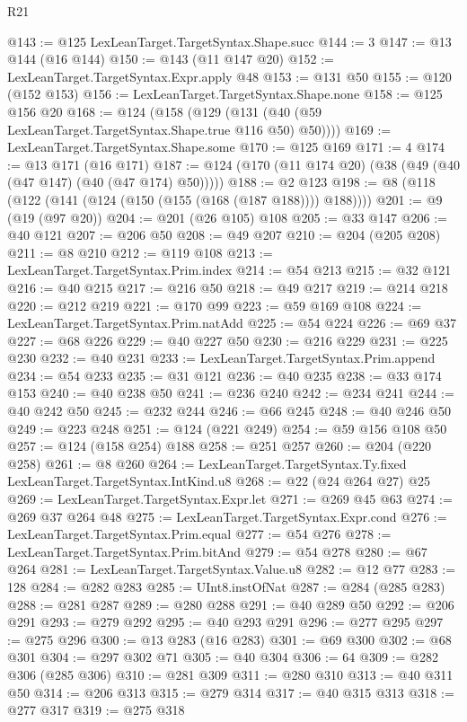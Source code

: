 \begin{lexlean}{R21}
\begin{coremodule}
{{{{{{{{{{{{{{{@143 := @125 LexLeanTarget.TargetSyntax.Shape.succ
@144 := 3
@147 := @13 @144 (@16 @144)
@150 := @143 (@11 @147 @20)
@152 := LexLeanTarget.TargetSyntax.Expr.apply @48
@153 := @131 @50
@155 := @120 (@152 @153)
@156 := LexLeanTarget.TargetSyntax.Shape.none
@158 := @125 @156 @20
@168 := @124 (@158 (@129 (@131 (@40 (@59 LexLeanTarget.TargetSyntax.Shape.true @116 @50) @50))))
@169 := LexLeanTarget.TargetSyntax.Shape.some
@170 := @125 @169
@171 := 4
@174 := @13 @171 (@16 @171)
@187 := @124 (@170 (@11 @174 @20) (@38 (@49 (@40 (@47 @147) (@40 (@47 @174) @50)))))
@188 := @2 @123
@198 := @8 (@118 (@122 (@141 (@124 (@150 (@155 (@168 (@187 @188)))) @188))))
@201 := @9 (@19 (@97 @20))
@204 := @201 (@26 @105) @108
@205 := @33 @147
@206 := @40 @121
@207 := @206 @50
@208 := @49 @207
@210 := @204 (@205 @208)
@211 := @8 @210
@212 := @119 @108
@213 := LexLeanTarget.TargetSyntax.Prim.index
@214 := @54 @213
@215 := @32 @121
@216 := @40 @215
@217 := @216 @50
@218 := @49 @217
@219 := @214 @218
@220 := @212 @219
@221 := @170 @99
@223 := @59 @169 @108
@224 := LexLeanTarget.TargetSyntax.Prim.natAdd
@225 := @54 @224
@226 := @69 @37
@227 := @68 @226
@229 := @40 @227 @50
@230 := @216 @229
@231 := @225 @230
@232 := @40 @231
@233 := LexLeanTarget.TargetSyntax.Prim.append
@234 := @54 @233
@235 := @31 @121
@236 := @40 @235
@238 := @33 @174 @153
@240 := @40 @238 @50
@241 := @236 @240
@242 := @234 @241
@244 := @40 @242 @50
@245 := @232 @244
@246 := @66 @245
@248 := @40 @246 @50
@249 := @223 @248
@251 := @124 (@221 @249)
@254 := @59 @156 @108 @50
@257 := @124 (@158 @254) @188
@258 := @251 @257
@260 := @204 (@220 @258)
@261 := @8 @260
@264 := LexLeanTarget.TargetSyntax.Ty.fixed LexLeanTarget.TargetSyntax.IntKind.u8
@268 := @22 (@24 @264 @27) @25
@269 := LexLeanTarget.TargetSyntax.Expr.let
@271 := @269 @45 @63
@274 := @269 @37 @264 @48
@275 := LexLeanTarget.TargetSyntax.Expr.cond
@276 := LexLeanTarget.TargetSyntax.Prim.equal
@277 := @54 @276
@278 := LexLeanTarget.TargetSyntax.Prim.bitAnd
@279 := @54 @278
@280 := @67 @264
@281 := LexLeanTarget.TargetSyntax.Value.u8
@282 := @12 @77
@283 := 128
@284 := @282 @283
@285 := UInt8.instOfNat
@287 := @284 (@285 @283)
@288 := @281 @287
@289 := @280 @288
@291 := @40 @289 @50
@292 := @206 @291
@293 := @279 @292
@295 := @40 @293 @291
@296 := @277 @295
@297 := @275 @296
@300 := @13 @283 (@16 @283)
@301 := @69 @300
@302 := @68 @301
@304 := @297 @302 @71
@305 := @40 @304
@306 := 64
@309 := @282 @306 (@285 @306)
@310 := @281 @309
@311 := @280 @310
@313 := @40 @311 @50
@314 := @206 @313
@315 := @279 @314
@317 := @40 @315 @313
@318 := @277 @317
@319 := @275 @318
}}}}}}}}}}}}}}}
\end{coremodule}
\end{lexlean}
